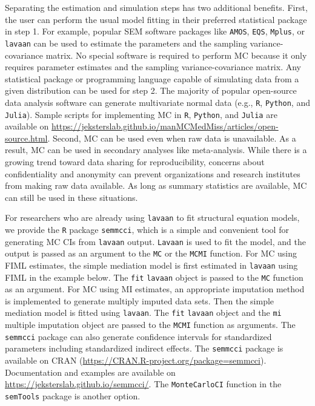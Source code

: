 \documentclass[man]{apa7}\usepackage[]{graphicx}\usepackage[]{xcolor}
\begin{document}
Separating the estimation and simulation steps has two additional benefits.
First,
the user can perform the usual model fitting in their preferred statistical package in step 1.
For example,
popular SEM software packages like 
\texttt{AMOS},
\texttt{EQS},
\texttt{Mplus},
or
\texttt{lavaan}
can be used to estimate the parameters
and the sampling variance-covariance matrix.
No special software is required to perform MC because it only requires parameter estimates and the sampling variance-covariance matrix.
Any statistical package or programming language capable of simulating data from a given distribution can be used for step 2.
The majority of popular open-source data analysis software can generate multivariate normal data 
(e.g.,
\texttt{R},
\texttt{Python},
and
\texttt{Julia}).
Sample scripts for implementing MC in
\texttt{R},
\texttt{Python},
and
\texttt{Julia}
are available on
\url{https://jeksterslab.github.io/manMCMedMiss/articles/open-source.html}. 
Second,
MC can be used even when raw data is unavailable.
As a result,
MC can be used in secondary analyses like meta-analysis.
While there is a growing trend toward data sharing for reproducibility,
concerns about confidentiality and anonymity can prevent organizations and research institutes from making raw data available.
As long as summary statistics are available,
MC can still be used in these situations.

For researchers who are already using \texttt{lavaan} to fit structural equation models,
we provide the \texttt{R} package \texttt{semmcci},
which is a simple and convenient tool for generating MC CIs from \texttt{lavaan} output.
\texttt{Lavaan} is used to fit the model,
and the output is passed as an argument to the \texttt{MC} or the \texttt{MCMI} function.
For MC using FIML estimates,
the simple mediation model is first estimated in \texttt{lavaan} using FIML in the example below.
The \texttt{fit} \texttt{lavaan} object is passed to the \texttt{MC} function as an argument.
For MC using MI estimates,
an appropriate imputation method is implemented to generate multiply imputed data sets.
Then the simple mediation model is fitted using \texttt{lavaan}.
The \texttt{fit} \texttt{lavaan} object and the \texttt{mi} multiple imputation object
are passed to the \texttt{MCMI} function as arguments.
The \texttt{semmcci} package can also generate confidence intervals for standardized parameters including standardized indirect effects. The \texttt{semmcci} package is available on CRAN (\url{https://CRAN.R-project.org/package=semmcci}). 
Documentation and examples are available on \url{https://jeksterslab.github.io/semmcci/}.
The \texttt{MonteCarloCI} function in the \texttt{semTools}
\parencite{Lib-Structural-Equation-Modeling-Software-Manuals-Jorgensen-2022} package is another option.
\end{document}
